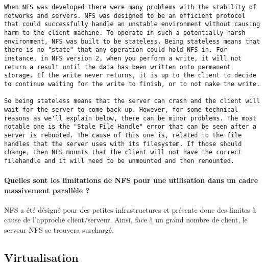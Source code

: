 \documentclass[a4paper]{article}
\begin{document}
\begin{lstlisting}[breaklines=true, basicstyle=\footnotesize, frame=single]
 When NFS was developed there were many problems with the stability of networks and servers. NFS was designed to be an efficient protocol that could successfully handle an unstable environment without causing harm to the client machine. To operate in such a potentially harsh environment, NFS was built to be stateless. Being stateless means that there is no "state" that any operation could hold NFS in. For instance, in NFS version 2, when you perform a write, it will not return a result until the data has been written onto permanent storage. If the write never returns, it is up to the client to decide to continue waiting for the write to finish, or to not make the write.

So being stateless means that the server can crash and the client will wait for the server to come back up. However, for some technical reasons as we'll explain below, there can be minor problems. The most notable one is the "Stale File Handle" error that can be seen after a server is rebooted. The cause of this one is, related to the file handles that the server uses with its filesystem. If those should change, then NFS mounts that the client will not have the correct filehandle and it will need to be unmounted and then remounted.
\end{lstlisting}

\paragraph{Quelles sont les limitations de NFS pour une utilisation dans un cadre massivement parallèle ?}
NFS a été désigné pour des petites infrastructures et présente donc des limites à cause de l'approche client/serveur. Ainsi, face à un grand nombre de client, le serveur NFS se trouvera surchargé.

\subsection{Virtualisation}
\end{document}
